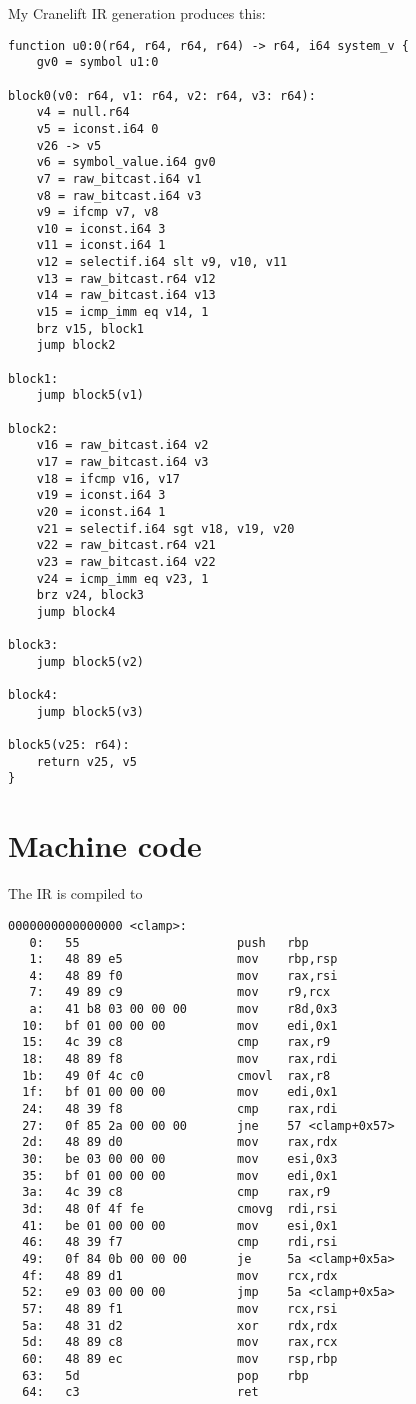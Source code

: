 My Cranelift IR generation produces this:

\begin{verbatim}
function u0:0(r64, r64, r64, r64) -> r64, i64 system_v {
    gv0 = symbol u1:0

block0(v0: r64, v1: r64, v2: r64, v3: r64):
    v4 = null.r64 
    v5 = iconst.i64 0
    v26 -> v5
    v6 = symbol_value.i64 gv0
    v7 = raw_bitcast.i64 v1
    v8 = raw_bitcast.i64 v3
    v9 = ifcmp v7, v8
    v10 = iconst.i64 3
    v11 = iconst.i64 1
    v12 = selectif.i64 slt v9, v10, v11
    v13 = raw_bitcast.r64 v12
    v14 = raw_bitcast.i64 v13
    v15 = icmp_imm eq v14, 1
    brz v15, block1
    jump block2

block1:
    jump block5(v1)

block2:
    v16 = raw_bitcast.i64 v2
    v17 = raw_bitcast.i64 v3
    v18 = ifcmp v16, v17
    v19 = iconst.i64 3
    v20 = iconst.i64 1
    v21 = selectif.i64 sgt v18, v19, v20
    v22 = raw_bitcast.r64 v21
    v23 = raw_bitcast.i64 v22
    v24 = icmp_imm eq v23, 1
    brz v24, block3
    jump block4

block3:
    jump block5(v2)

block4:
    jump block5(v3)

block5(v25: r64):
    return v25, v5
}
\end{verbatim}

\section{Machine code}

The IR is compiled to

\begin{verbatim}
0000000000000000 <clamp>:
   0:	55                   	push   rbp
   1:	48 89 e5             	mov    rbp,rsp
   4:	48 89 f0             	mov    rax,rsi
   7:	49 89 c9             	mov    r9,rcx
   a:	41 b8 03 00 00 00    	mov    r8d,0x3
  10:	bf 01 00 00 00       	mov    edi,0x1
  15:	4c 39 c8             	cmp    rax,r9
  18:	48 89 f8             	mov    rax,rdi
  1b:	49 0f 4c c0          	cmovl  rax,r8
  1f:	bf 01 00 00 00       	mov    edi,0x1
  24:	48 39 f8             	cmp    rax,rdi
  27:	0f 85 2a 00 00 00    	jne    57 <clamp+0x57>
  2d:	48 89 d0             	mov    rax,rdx
  30:	be 03 00 00 00       	mov    esi,0x3
  35:	bf 01 00 00 00       	mov    edi,0x1
  3a:	4c 39 c8             	cmp    rax,r9
  3d:	48 0f 4f fe          	cmovg  rdi,rsi
  41:	be 01 00 00 00       	mov    esi,0x1
  46:	48 39 f7             	cmp    rdi,rsi
  49:	0f 84 0b 00 00 00    	je     5a <clamp+0x5a>
  4f:	48 89 d1             	mov    rcx,rdx
  52:	e9 03 00 00 00       	jmp    5a <clamp+0x5a>
  57:	48 89 f1             	mov    rcx,rsi
  5a:	48 31 d2             	xor    rdx,rdx
  5d:	48 89 c8             	mov    rax,rcx
  60:	48 89 ec             	mov    rsp,rbp
  63:	5d                   	pop    rbp
  64:	c3                   	ret    

\end{verbatim}

